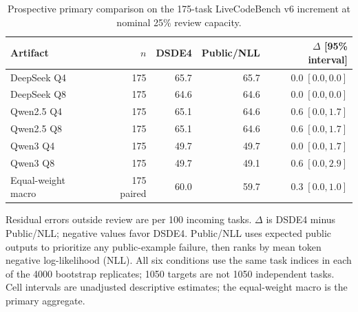 \begin{table}[htbp]
\centering
\caption{Prospective primary comparison on the 175-task LiveCodeBench v6 increment at nominal 25\% review capacity.}
\label{tab:validation}
\small
\begin{tabular}{lrrrr}
\toprule
Artifact & $n$ & DSDE4 & Public/NLL & $\Delta$ [95\% interval] \\
\midrule
DeepSeek Q4 & 175 & 65.7 & 65.7 & $0.0\;[0.0, 0.0]$ \\
DeepSeek Q8 & 175 & 64.6 & 64.6 & $0.0\;[0.0, 0.0]$ \\
Qwen2.5 Q4 & 175 & 65.1 & 64.6 & $0.6\;[0.0, 1.7]$ \\
Qwen2.5 Q8 & 175 & 65.1 & 64.6 & $0.6\;[0.0, 1.7]$ \\
Qwen3 Q4 & 175 & 49.7 & 49.7 & $0.0\;[0.0, 1.7]$ \\
Qwen3 Q8 & 175 & 49.7 & 49.1 & $0.6\;[0.0, 2.9]$ \\
Equal-weight macro & 175 paired & 60.0 & 59.7 & $0.3\;[0.0, 1.0]$ \\
\bottomrule
\end{tabular}
\par\vspace{4pt}\begin{minipage}{0.98\linewidth}\footnotesize Residual errors outside review are per 100 incoming tasks. $\Delta$ is DSDE4 minus Public/NLL; negative values favor DSDE4. Public/NLL uses expected public outputs to prioritize any public-example failure, then ranks by mean token negative log-likelihood (NLL). All six conditions use the same task indices in each of the 4000 bootstrap replicates; 1050 targets are not 1050 independent tasks. Cell intervals are unadjusted descriptive estimates; the equal-weight macro is the primary aggregate.\end{minipage}
\end{table}
